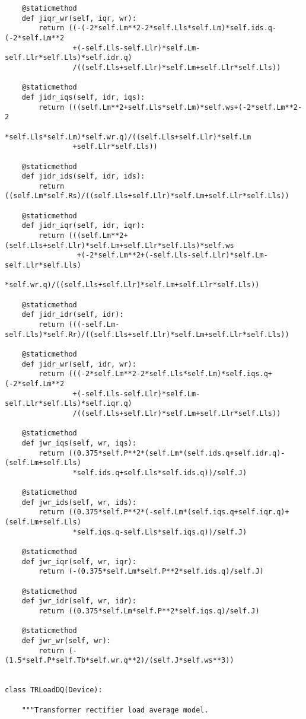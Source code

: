 \begin{lstlisting}
    @staticmethod
    def jiqr_wr(self, iqr, wr):
        return ((-(-2*self.Lm**2-2*self.Lls*self.Lm)*self.ids.q-(-2*self.Lm**2
                +(-self.Lls-self.Llr)*self.Lm-self.Llr*self.Lls)*self.idr.q)
                /((self.Lls+self.Llr)*self.Lm+self.Llr*self.Lls))

    @staticmethod
    def jidr_iqs(self, idr, iqs):
        return (((self.Lm**2+self.Lls*self.Lm)*self.ws+(-2*self.Lm**2-2
                *self.Lls*self.Lm)*self.wr.q)/((self.Lls+self.Llr)*self.Lm
                +self.Llr*self.Lls))

    @staticmethod
    def jidr_ids(self, idr, ids):
        return ((self.Lm*self.Rs)/((self.Lls+self.Llr)*self.Lm+self.Llr*self.Lls))

    @staticmethod
    def jidr_iqr(self, idr, iqr):
        return (((self.Lm**2+(self.Lls+self.Llr)*self.Lm+self.Llr*self.Lls)*self.ws
                 +(-2*self.Lm**2+(-self.Lls-self.Llr)*self.Lm-self.Llr*self.Lls)
                 *self.wr.q)/((self.Lls+self.Llr)*self.Lm+self.Llr*self.Lls))

    @staticmethod
    def jidr_idr(self, idr):
        return (((-self.Lm-self.Lls)*self.Rr)/((self.Lls+self.Llr)*self.Lm+self.Llr*self.Lls))

    @staticmethod
    def jidr_wr(self, idr, wr):
        return (((-2*self.Lm**2-2*self.Lls*self.Lm)*self.iqs.q+(-2*self.Lm**2
                +(-self.Lls-self.Llr)*self.Lm-self.Llr*self.Lls)*self.iqr.q)
                /((self.Lls+self.Llr)*self.Lm+self.Llr*self.Lls))

    @staticmethod
    def jwr_iqs(self, wr, iqs):
        return ((0.375*self.P**2*(self.Lm*(self.ids.q+self.idr.q)-(self.Lm+self.Lls)
                *self.ids.q+self.Lls*self.ids.q))/self.J)

    @staticmethod
    def jwr_ids(self, wr, ids):
        return ((0.375*self.P**2*(-self.Lm*(self.iqs.q+self.iqr.q)+(self.Lm+self.Lls)
                *self.iqs.q-self.Lls*self.iqs.q))/self.J)

    @staticmethod
    def jwr_iqr(self, wr, iqr):
        return (-(0.375*self.Lm*self.P**2*self.ids.q)/self.J)

    @staticmethod
    def jwr_idr(self, wr, idr):
        return ((0.375*self.Lm*self.P**2*self.iqs.q)/self.J)

    @staticmethod
    def jwr_wr(self, wr):
        return (-(1.5*self.P*self.Tb*self.wr.q**2)/(self.J*self.ws**3))


class TRLoadDQ(Device):

    """Transformer rectifier load average model.



\end{lstlisting}

